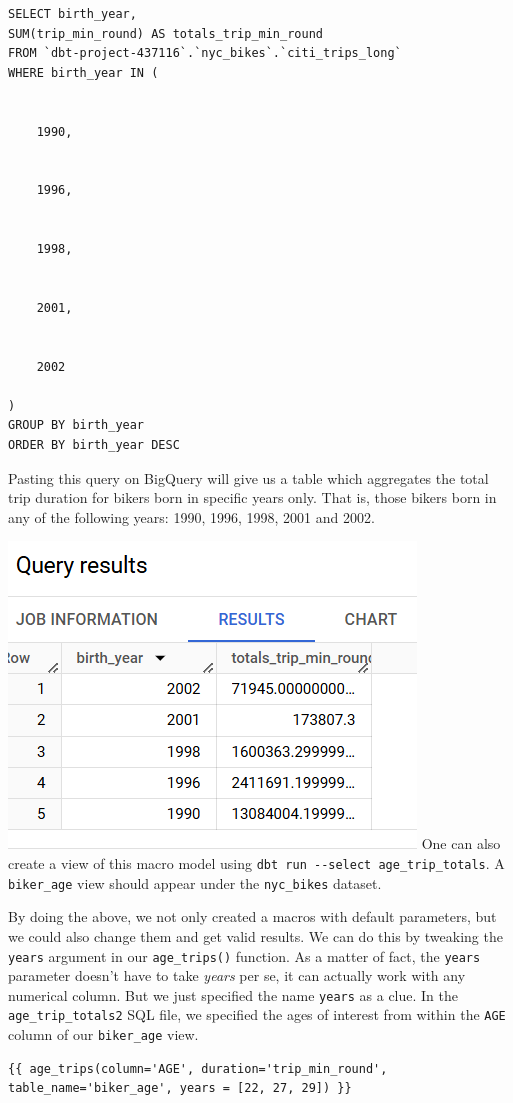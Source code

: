 \documentclass[
]{book}
\begin{document}
\begin{verbatim}
SELECT birth_year, 
SUM(trip_min_round) AS totals_trip_min_round
FROM `dbt-project-437116`.`nyc_bikes`.`citi_trips_long`
WHERE birth_year IN (
  
  
    1990, 
  
  
    1996, 
  
  
    1998, 
  
  
    2001, 
  
  
    2002
  
)
GROUP BY birth_year
ORDER BY birth_year DESC
\end{verbatim}

Pasting this query on BigQuery will give us a table which aggregates the total trip duration for bikers born in specific years only. That is, those bikers born in any of the following years: 1990, 1996, 1998, 2001 and 2002.

\includegraphics{./images/age_trip.png}
One can also create a view of this macro model using \texttt{dbt\ run\ -\/-select\ age\_trip\_totals}. A \texttt{biker\_age} view should appear under the \texttt{nyc\_bikes} dataset.

By doing the above, we not only created a macros with default parameters, but we could also change them and get valid results. We can do this by tweaking the \texttt{years} argument in our \texttt{age\_trips()} function. As a matter of fact, the \texttt{years} parameter doesn't have to take \emph{years} per se, it can actually work with any numerical column. But we just specified the name \texttt{years} as a clue. In the \texttt{age\_trip\_totals2} SQL file, we specified the ages of interest from within the \texttt{AGE} column of our \texttt{biker\_age} view.

\begin{verbatim}
{{ age_trips(column='AGE', duration='trip_min_round',
table_name='biker_age', years = [22, 27, 29]) }}
\end{verbatim}
\end{document}
